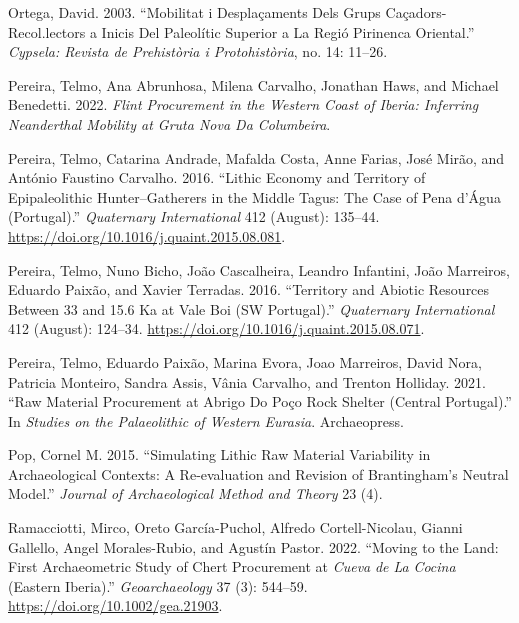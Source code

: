 \documentclass[
  a4paper,
  DIV=11,
  numbers=noendperiod]{scrreprt}
\newlength{\cslhangindent}
\newenvironment{CSLReferences}[2] %
 {\begin{list}{}{%
  \setlength{\itemindent}{0pt}
  \setlength{\leftmargin}{0pt}
  \setlength{\parsep}{0pt}
  \ifodd #1
   \setlength{\leftmargin}{\cslhangindent}
   \setlength{\itemindent}{-1\cslhangindent}
  \fi
  \setlength{\itemsep}{#2\baselineskip}}}
 {\end{list}}
\begin{document}
\begin{CSLReferences}{1}{0}
Ortega, David. 2003. {``Mobilitat i Despla{ç}aments Dels Grups
Ca{ç}adors-Recol.lectors a Inicis Del {Paleol{í}tic Superior} a La
Regi{ó} Pirinenca Oriental.''} \emph{Cypsela: Revista de Prehist{ò}ria i
Protohist{ò}ria}, no. 14: 11--26.

Pereira, Telmo, Ana Abrunhosa, Milena Carvalho, Jonathan Haws, and
Michael Benedetti. 2022. \emph{Flint Procurement in the Western Coast of
{Iberia}: Inferring Neanderthal Mobility at {Gruta Nova} Da
{Columbeira}}.

Pereira, Telmo, Catarina Andrade, Mafalda Costa, Anne Farias, José
Mirão, and António Faustino Carvalho. 2016. {``Lithic Economy and
Territory of {Epipaleolithic} Hunter--Gatherers in the {Middle Tagus}:
{The} Case of {Pena} d'{{Á}gua} ({Portugal}).''} \emph{Quaternary
International} 412 (August): 135--44.
\url{https://doi.org/10.1016/j.quaint.2015.08.081}.

Pereira, Telmo, Nuno Bicho, João Cascalheira, Leandro Infantini, João
Marreiros, Eduardo Paixão, and Xavier Terradas. 2016. {``Territory and
Abiotic Resources Between 33 and 15.6 Ka at {Vale Boi} ({SW
Portugal}).''} \emph{Quaternary International} 412 (August): 124--34.
\url{https://doi.org/10.1016/j.quaint.2015.08.071}.

Pereira, Telmo, Eduardo Paixão, Marina Evora, Joao Marreiros, David
Nora, Patricia Monteiro, Sandra Assis, Vânia Carvalho, and Trenton
Holliday. 2021. {``Raw Material Procurement at {Abrigo} Do {Po{ç}o Rock}
Shelter ({Central Portugal}).''} In \emph{Studies on the {Palaeolithic}
of {Western Eurasia}}. Archaeopress.

Pop, Cornel M. 2015. {``Simulating {Lithic Raw Material Variability} in
{Archaeological Contexts}: {A Re-evaluation} and {Revision} of
{Brantingham}'s {Neutral Model}.''} \emph{Journal of Archaeological
Method and Theory} 23 (4).

Ramacciotti, Mirco, Oreto García-Puchol, Alfredo Cortell-Nicolau, Gianni
Gallello, Angel Morales-Rubio, and Agustín Pastor. 2022. {``Moving to
the Land: {First} Archaeometric Study of Chert Procurement at
{\emph{Cueva}}{ \emph{de La} }{\emph{Cocina}} ({Eastern Iberia}).''}
\emph{Geoarchaeology} 37 (3): 544--59.
\url{https://doi.org/10.1002/gea.21903}.


\end{CSLReferences}
\end{document}
